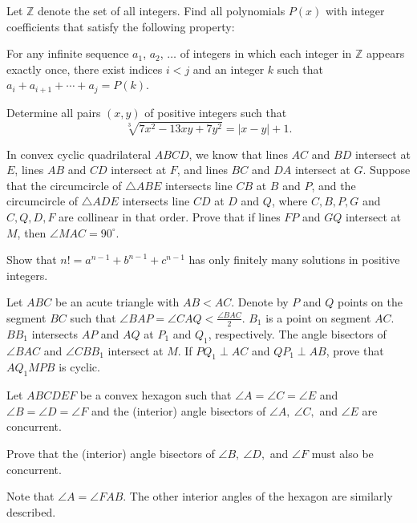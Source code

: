 \documentclass[11pt]{scrartcl}
\begin{document}
\begin{problem}[2270109693486247508]
Let $\mathbb{Z}$ denote the set of all integers. Find all polynomials $P(x)$ with integer coefficients that satisfy the following property:

For any infinite sequence $a_1$, $a_2$, $\dotsc$ of integers in which each integer in $\mathbb{Z}$ appears exactly once, there exist indices $i < j$ and an integer $k$ such that $a_i +a_{i+1} +\dotsb +a_j = P(k)$.
\end{problem}
\begin{problem}[757902621276461]
	Determine all pairs $(x, y)$ of positive integers such that\[\sqrt[3]{7x^2-13xy+7y^2}=|x-y|+1.\]
\end{problem}
\begin{problem}[6340105142765788083]
In convex cyclic quadrilateral $ABCD$, we know that lines $AC$ and $BD$ intersect at $E$, lines $AB$ and $CD$ intersect at $F$, and lines $BC$ and $DA$ intersect at $G$. Suppose that the circumcircle of $\triangle ABE$ intersects line $CB$ at $B$ and $P$, and the circumcircle of $\triangle ADE$ intersects line $CD$ at $D$ and $Q$, where $C,B,P,G$ and $C,Q,D,F$ are collinear in that order. Prove that if lines $FP$ and $GQ$ intersect at $M$, then $\angle MAC = 90^\circ$.
\end{problem}
\begin{problem}[599825051147866097]
Show that $n!=a^{n-1}+b^{n-1}+c^{n-1}$ has only finitely many solutions in positive integers.
\end{problem}
\begin{problem}[806540218855542]
Let $ABC$ be an acute triangle with $AB< AC$. Denote by $P$ and $Q$ points on the segment $BC$ such that $\angle BAP = \angle CAQ < \frac{\angle BAC}{2}$. $B_1$ is a point on segment $AC$. $BB_1$ intersects $AP$ and $AQ$ at $P_1$ and $Q_1$, respectively. The angle bisectors of $\angle BAC$ and $\angle CBB_1$ intersect at $M$. If $PQ_1\perp AC$ and $QP_1\perp AB$, prove that $AQ_1MPB$ is cyclic.
\end{problem}
\begin{problem}[1073572769363152471]
	Let $ABCDEF$ be a convex hexagon such that $\angle A = \angle C = \angle E$ and $\angle B = \angle D = \angle F$ and the (interior) angle bisectors of $\angle A, ~\angle C,$ and $\angle E$ are concurrent.

Prove that the (interior) angle bisectors of $\angle B, ~\angle D, $ and $\angle F$ must also be concurrent.

Note that $\angle A = \angle FAB$. The other interior angles of the hexagon are similarly described.
\end{problem}
\end{document}
